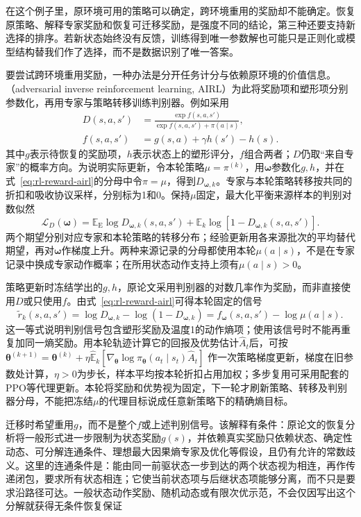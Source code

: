 在这个例子里，原环境可用的策略可以确定，跨环境重用的奖励却不能确定。恢复原策略、解释专家奖励和恢复可迁移奖励，是强度不同的结论，第三种还要支持新选择的排序。若新状态始终没有反馈，训练得到唯一参数解也可能只是正则化或模型结构替我们作了选择，而不是数据识别了唯一答案。

要尝试跨环境重用奖励，一种办法是分开任务计分与依赖原环境的价值信息。（adversarial inverse reinforcement learning, AIRL）为此将奖励项和塑形项分别参数化，再用专家与策略转移训练判别器。例如采用
\begin{equation}
  \begin{aligned}
    D(s,a,s')&=\frac{\exp f(s,a,s')}
                         {\exp f(s,a,s')+\pi(a\mid s)},\\
    f(s,a,s')&=g(s,a)+\gamma h(s')-h(s).
  \end{aligned}
  \label{eq:rl-reward-airl}
\end{equation}
其中$g$表示待恢复的奖励项，$h$表示状态上的塑形评分，$f$组合两者；$D$仍取“来自专家”的概率方向。为说明实际更新，令本轮策略$\mu=\pi^{(k)}$，用$\bm\omega$参数化$g,h$，并在式~\eqref{eq:rl-reward-airl}的分母中令$\pi=\mu$，得到$D_{\bm\omega,k}$。专家与本轮策略转移按共同的折扣和吸收协议采样，分别标为1和0。保持$\mu$固定，最大化平衡来源样本的判别对数似然
\[
  \mathcal L_D(\bm\omega)
  =\mathbb E_{\mathrm E}\log D_{\bm\omega,k}(s,a,s')
    +\mathbb E_k\log[1-D_{\bm\omega,k}(s,a,s')] .
\]
两个期望分别对应专家和本轮策略的转移分布；经验更新用各来源批次的平均替代期望，再对$\bm\omega$作梯度上升。两种来源记录的分母都使用本轮$\mu(a\mid s)$，不是在专家记录中换成专家动作概率；在所用状态动作支持上须有$\mu(a\mid s)>0$。

策略更新时冻结学出的$g,h$，原论文采用判别器的对数几率作为奖励，而非直接使用$D$或只使用$f$。由式~\eqref{eq:rl-reward-airl}可得本轮固定的信号
\[
  \widetilde r_k(s,a,s')
  =\log D_{\bm\omega,k}-\log(1-D_{\bm\omega,k})
  =f_{\bm\omega}(s,a,s')-\log\mu(a\mid s).
\]
这一等式说明判别信号包含塑形奖励及温度1的动作熵项；使用该信号时不能再重复加同一熵奖励。用本轮轨迹计算它的回报及优势估计$\widehat A_t$后，可按
$\bm\theta^{(k+1)}=\bm\theta^{(k)}
+\eta\widehat{\mathbb E}_k[
\nabla_{\bm\theta}\log\pi_{\bm\theta}(a_t\mid s_t)\widehat A_t]$
作一次策略梯度更新，梯度在旧参数处计算，$\eta>0$为步长，样本平均按本轮折扣占用加权；多步复用可采用配套的PPO等代理更新。本轮将奖励和优势视为固定，下一轮才刷新策略、转移及判别器分母，不能把冻结$\mu$的代理目标说成任意新策略下的精确熵目标。

迁移时希望重用$g$，而不是整个$f$或上述判别信号。该解释有条件：原论文的恢复分析将一般形式进一步限制为状态奖励$g(s)$，并依赖真实奖励只依赖状态、确定性动态、可分解连通条件、理想最大因果熵专家及优化等假设，且仍有允许的常数歧义。这里的连通条件是：能由同一前驱状态一步到达的两个状态视为相连，再作传递闭包，要求所有状态相连；它使当前状态项与后继状态项能够分离，而不只是要求沿路径可达。一般状态动作奖励、随机动态或有限次优示范，不会仅因写出这个分解就获得无条件恢复保证

